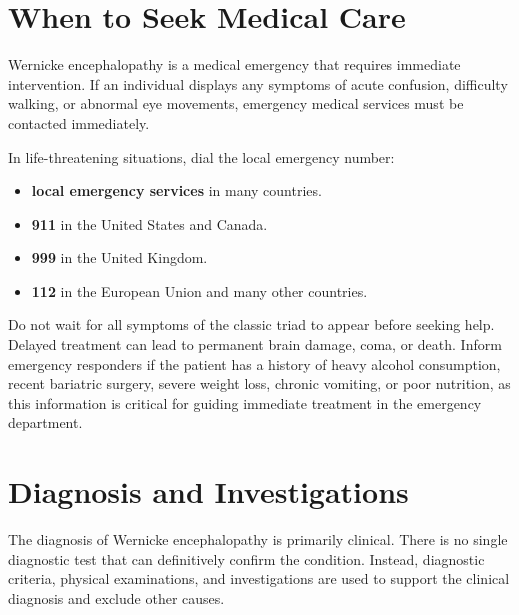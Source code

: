 \section*{When to Seek Medical Care}
Wernicke encephalopathy is a medical emergency that requires immediate intervention. If an individual displays any symptoms of acute confusion, difficulty walking, or abnormal eye movements, emergency medical services must be contacted immediately.

In life-threatening situations, dial the local emergency number:
\begin{itemize}
    \item \textbf{local emergency services} in many countries.
    \item \textbf{911} in the United States and Canada.
    \item \textbf{999} in the United Kingdom.
    \item \textbf{112} in the European Union and many other countries.
\end{itemize}

Do not wait for all symptoms of the classic triad to appear before seeking help. Delayed treatment can lead to permanent brain damage, coma, or death. Inform emergency responders if the patient has a history of heavy alcohol consumption, recent bariatric surgery, severe weight loss, chronic vomiting, or poor nutrition, as this information is critical for guiding immediate treatment in the emergency department.

\section*{Diagnosis and Investigations}
The diagnosis of Wernicke encephalopathy is primarily clinical. There is no single diagnostic test that can definitively confirm the condition. Instead, diagnostic criteria, physical examinations, and investigations are used to support the clinical diagnosis and exclude other causes.

